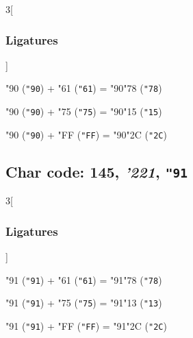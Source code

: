 \documentclass{article}
\newlength{\maxcharwidth}
\begin{document}
\begin{multicols}{3}[\subsubsection{Ligatures}]

{\testfont\char"90\noboundary} ({\tt"90}) + {\testfont\char"61\noboundary} ({\tt"61}) = {\testfont\char"90\noboundary}{\testfont\char"78\noboundary} ({\tt"78}) 

{\testfont\char"90\noboundary} ({\tt"90}) + {\testfont\char"75\noboundary} ({\tt"75}) = {\testfont\char"90\noboundary}{\testfont\char"15\noboundary} ({\tt"15}) 

{\testfont\char"90\noboundary} ({\tt"90}) + {\testfont\char"FF\noboundary} ({\tt"FF}) = {\testfont\char"90\noboundary}{\testfont\char"2C\noboundary} ({\tt"2C}) 

\end{multicols}

\subsection{Char code: 145, {\it'221}, {\tt"91}}
\label{char_145}


\begin{multicols}{3}[\subsubsection{Ligatures}]

{\testfont\char"91\noboundary} ({\tt"91}) + {\testfont\char"61\noboundary} ({\tt"61}) = {\testfont\char"91\noboundary}{\testfont\char"78\noboundary} ({\tt"78}) 

{\testfont\char"91\noboundary} ({\tt"91}) + {\testfont\char"75\noboundary} ({\tt"75}) = {\testfont\char"91\noboundary}{\testfont\char"13\noboundary} ({\tt"13}) 

{\testfont\char"91\noboundary} ({\tt"91}) + {\testfont\char"FF\noboundary} ({\tt"FF}) = {\testfont\char"91\noboundary}{\testfont\char"2C\noboundary} ({\tt"2C}) 

\end{multicols}
\end{document}
